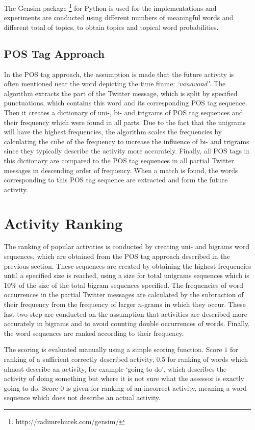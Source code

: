 The Gensim package \footnote{http://radimrehurek.com/gensim/} for Python is used for the implementations and experiments are conducted using different numbers of meaningful words and different total of topics, to obtain topics and topical word probabilities. 

\subsection{POS Tag Approach}
In the POS tag approach, the assumption is made that the future activity is often mentioned near the word depicting the time frame: \textit{`vanavond'}. The algorithm extracts the part of the Twitter message, which is split by specified punctuations, which contains this word and its corresponding POS tag sequence. Then it creates a dictionary of uni-, bi- and trigrams of POS tag sequences and their frequency which were found in all parts. Due to the fact that the unigrams will have the highest frequencies, the algorithm scales the frequencies by calculating the cube of the frequency to increase the influence of bi- and trigrams since they typically describe the activity more accurately. Finally, all POS tags in this dictionary are compared to the POS tag sequences in all partial Twitter messages in descending order of frequency. When a match is found, the words corresponding to this POS tag sequence are extracted and form the future activity.

\section{Activity Ranking}\label{sec:ranking}
The ranking of popular activities is conducted by creating uni- and bigrams word sequences, which are obtained from the POS tag approach described in the previous section. These sequences are created by obtaining the highest frequencies until a specified size is reached, using a size for total unigrams sequences which is 10\% of the size of the total bigram sequences specified. The frequencies of word occurrences in the partial Twitter messages are calculated by the subtraction of their frequency from the frequency of larger $n$-grams in which they occur. These last two step are conducted on the assumption that activities are described more accurately in bigrams and to avoid counting double occurrences of words. Finally, the word sequences are ranked according to their frequency.

The scoring is evaluated manually using a simple scoring function. Score $1$ for ranking of a sufficient correctly described activity, $0.5$ for ranking of words which almost describe an activity, for example `going to do', which describes the activity of doing something but where it is not sure what the assessor is exactly going to do. Score $0$ is given for ranking of an incorrect activity, meaning a word sequence which does not describe an actual activity.
\fi